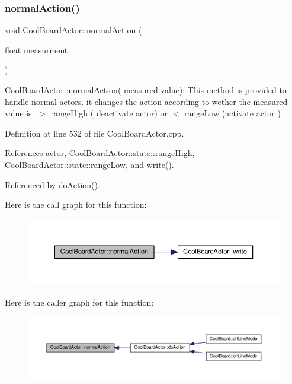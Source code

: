 \subsubsection{\texorpdfstring{normal\+Action()}{normalAction()}}
{\footnotesize\ttfamily void Cool\+Board\+Actor\+::normal\+Action (\begin{DoxyParamCaption}\item[{float}]{measurment }\end{DoxyParamCaption})}

Cool\+Board\+Actor\+::normal\+Action( measured value)\+: This method is provided to handle normal actors. it changes the action according to wether the measured value is\+: $>$ range\+High ( deactivate actor) or $<$ range\+Low (activate actor ) 

Definition at line 532 of file Cool\+Board\+Actor.\+cpp.



References actor, Cool\+Board\+Actor\+::state\+::range\+High, Cool\+Board\+Actor\+::state\+::range\+Low, and write().



Referenced by do\+Action().

Here is the call graph for this function\+:
\nopagebreak
\begin{figure}[H]
\begin{center}
\leavevmode
\includegraphics[width=350pt]{dc/d69/class_cool_board_actor_a81229abf5895f4d3b0355050b822b438_cgraph}
\end{center}
\end{figure}
Here is the caller graph for this function\+:
\nopagebreak
\begin{figure}[H]
\begin{center}
\leavevmode
\includegraphics[width=350pt]{dc/d69/class_cool_board_actor_a81229abf5895f4d3b0355050b822b438_icgraph}
\end{center}
\end{figure}
\mbox{\label{class_cool_board_actor_aae82b2e62f91be009d40f93c206f9bda}} 
